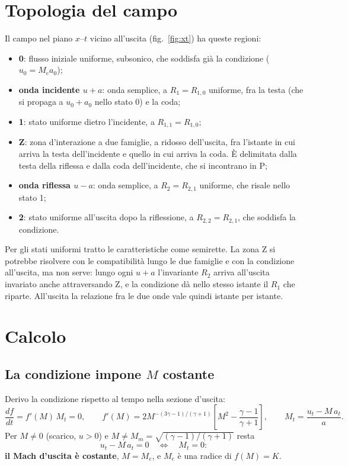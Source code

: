 \documentclass[11pt,a4paper]{article}
\newcommand{\Ru}{R_1}
\newcommand{\Rd}{R_2}
\newcommand{\uma}{u-a}
\newcommand{\upa}{u+a}
\newcommand{\Me}{M_e}
\begin{document}
\section{Topologia del campo}
Il campo nel piano $x$--$t$ vicino all'uscita (fig.~\ref{fig:xt}) ha queste regioni:
\begin{itemize}
  \item \textbf{0}: flusso iniziale uniforme, subsonico, che soddisfa già la condizione ($u_0=\Me a_0$);
  \item \textbf{onda incidente $\upa$}: onda semplice, a $\Ru=R_{1,0}$ uniforme, fra la testa (che si propaga a
        $u_0+a_0$ nello stato 0) e la coda;
  \item \textbf{1}: stato uniforme dietro l'incidente, a $R_{1,1}=R_{1,0}$;
  \item \textbf{Z}: zona d'interazione a due famiglie, a ridosso dell'uscita, fra l'istante in cui arriva la testa
        dell'incidente e quello in cui arriva la coda. È delimitata dalla testa della riflessa e dalla coda
        dell'incidente, che si incontrano in P;
  \item \textbf{onda riflessa $\uma$}: onda semplice, a $\Rd=R_{2,1}$ uniforme, che risale nello stato 1;
  \item \textbf{2}: stato uniforme all'uscita dopo la riflessione, a $R_{2,2}=R_{2,1}$, che soddisfa la condizione.
\end{itemize}
Per gli stati uniformi tratto le caratteristiche come semirette. La zona Z si potrebbe risolvere con le
compatibilità lungo le due famiglie e con la condizione all'uscita, ma non serve: lungo ogni $\upa$ l'invariante
$\Rd$ arriva all'uscita invariato anche attraversando Z, e la condizione dà nello stesso istante il $\Ru$ che
riparte. All'uscita la relazione fra le due onde vale quindi istante per istante.

\section{Calcolo}
\subsection{La condizione impone $M$ costante}
Derivo la condizione rispetto al tempo nella sezione d'uscita:
\[
  \frac{d f}{d t}=f'(M)\,M_t=0,\qquad
  f'(M)=2M^{-(3\gamma-1)/(\gamma+1)}\left[M^2-\frac{\gamma-1}{\gamma+1}\right],\qquad
  M_t=\frac{u_t-M\,a_t}{a}.
\]
Per $M\neq0$ (scarico, $u>0$) e $M\neq M_m=\sqrt{(\gamma-1)/(\gamma+1)}$ resta
\[
  u_t-M\,a_t=0\quad\Longleftrightarrow\quad M_t=0 :
\]
\textbf{il Mach d'uscita è costante}, $M=\Me$, e $\Me$ è una radice di $f(M)=K$.
\end{document}
